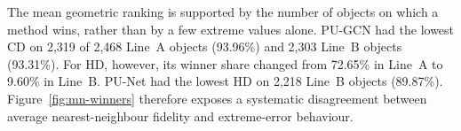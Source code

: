 The mean geometric ranking is supported by the number of objects on which
a method wins, rather than by a few extreme values alone.
PU-GCN had the lowest CD on 2,319 of 2,468 Line~A objects (93.96\%)
and 2,303 Line~B objects (93.31\%). For HD, however, its winner share
changed from 72.65\% in Line~A to 9.60\% in Line~B.
PU-Net had the lowest HD on 2,218 Line~B objects (89.87\%).
Figure~\ref{fig:mn-winners} therefore exposes a systematic disagreement
between average nearest-neighbour fidelity and extreme-error behaviour.


